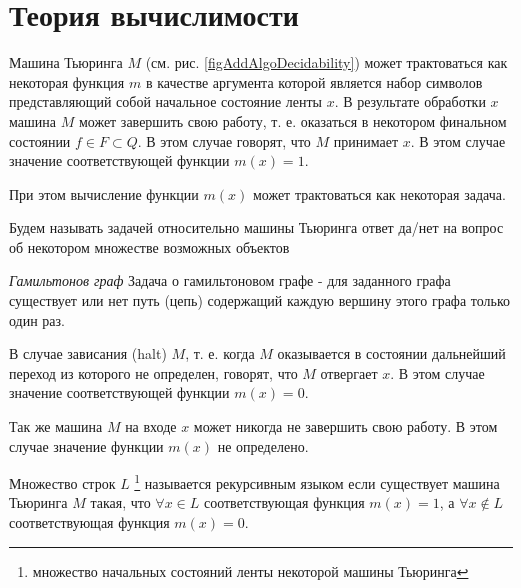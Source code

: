 \section{Теория вычислимости}

Машина Тьюринга $M$ (см. рис. \ref{figAddAlgoDecidability}) может
трактоваться как некоторая функция $m$ в качестве 
аргумента которой является набор символов представляющий собой
начальное состояние ленты $x$. В результате обработки $x$ машина $M$
может завершить свою работу, т. е. оказаться в некотором финальном
состоянии $f \in F \subset Q$. В этом случае говорят, что $M$
принимает $x$. В этом случае значение соответствующей функции 
$m(x) = 1$. 

При этом вычисление функции $m(x)$ может трактоваться как некоторая
задача.  
\begin{definition}[Задача]
Будем называть задачей относительно машины Тьюринга ответ да/нет на
вопрос об некотором множестве возможных объектов
\end{definition}

\begin{example}
\emph{Гамильтонов граф}
Задача о гамильтоновом графе - для заданного графа существует или нет
путь (цепь) содержащий каждую вершину этого графа только один раз.
\nonumber
\end{example}




В случае зависания (halt) $M$, т. е. когда $M$
оказывается в состоянии дальнейший переход из которого не определен,
говорят, что $M$ отвергает $x$. В этом случае значение соответствующей
функции $m(x) =0$. 

Так же машина $M$ на входе $x$ может никогда не
завершить свою работу. В этом случае значение функции $m(x)$
не определено.    

\begin{definition}
Множество строк $L$
\footnote{множество начальных состояний ленты некоторой
машины Тьюринга}
называется рекурсивным языком если существует машина Тьюринга $M$
такая, что $\forall x \in L$ соответствующая функция $m(x) = 1$, а 
$\forall x \notin L$ соответствующая функция $m(x) = 0$. 
\end{definition}

